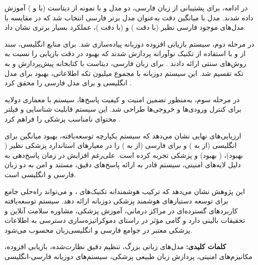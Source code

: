 \documentclass[11pt, a4paper, oneside]{book}
\begin{document}
	در ادامه، برای پشتیبانی از زبان فارسی، دو مدل  و  با  نمونه از دیتاست  (با  و ) آموزش داده شدند. مدل  با میانگین دقت  به‌عنوان مدل برتر فارسی انتخاب شد که در مقایسه با مدل‌های موجود فارسی نظیر  (با دقت ) و  (با دقت )، عملکرد بسیار برتری نشان داد.

	در مرحله دوم، سیستم بازیابی افزوده دوزبانه پیاده‌سازی شد. برای منابع انگلیسی،  سند از  و  با استفاده از تکنیک نوآورانه  پردازش شدند که بهبود  در دقت بازیابی را نسبت به روش‌های سنتی ارائه دادند \cite{lewis_retrieval-augmented_2021}. برای زبان فارسی، دیتاست  با کتابخانه  پیش‌پردازش و به  تکه تقسیم شد. این سیستم دوزبانه با مجموع  میلیون تکه اطلاعاتی، بهبود  برای مدل انگلیسی و  برای مدل فارسی را محقق کرد \cite{izacard2021leveraging}.

	در مرحله سوم، به‌منظور تضمین امنیت و کیفیت پاسخ‌ها، سیستم  با معماری دولایه برای کنترل ورودی‌ها و خروجی‌ها طراحی شد. این سیستم قابلیت شناسایی و فیلتر محتوای نامناسب پزشکی را فراهم کرد \cite{hallucinationguardrails2023openai}.

	ارزیابی‌های نهایی نشان می‌دهد که سیستم یکپارچه توسعه‌یافته، بهبود میانگین  برای انگلیسی (از  به ) و  برای فارسی (از  به ) را در معیارهای استاندارد پزشکی نظیر  ( بهبود)،  ( بهبود) و  پزشکی تجربه کرده است. علی‌رغم افزایش  در زمان پاسخ‌دهی به دلیل لایه‌های امنیتی، سیستم قادر به ارائه پاسخ‌های دقیق، مستند و امن به دو زبان فارسی و انگلیسی است.

	این پژوهش نشان می‌دهد که ترکیب هوشمندانه تکنیک‌های ،  و  می‌تواند راه‌حلی جامع برای توسعه دستیارهای هوشمند پزشکی دوزبانه ارائه دهد. سیستم توسعه‌یافته کاربردهای گسترده‌ای در مراکز درمانی، آموزش پزشکی، مشاوره سلامت آنلاین و تحقیقات بالینی دارد و گامی مؤثر در راستای دموکراتیزه‌سازی دسترسی به اطلاعات پزشکی معتبر در جوامع فارسی و انگلیسی‌زبان محسوب می‌شود.

	\textbf{کلمات کلیدی:} مدل‌های زبانی بزرگ، تنظیم دقیق نظارت‌شده، بازیابی افزوده، مکانیزم‌های امنیتی، پردازش زبان طبیعی پزشکی، سیستم‌های دوزبانه فارسی-انگلیسی

	\newpage
	\tableofcontents
	\listoffigures
	\listoftables
	\lstlistoflistings
	\newpage
	\mainmatter
	
\end{document}
